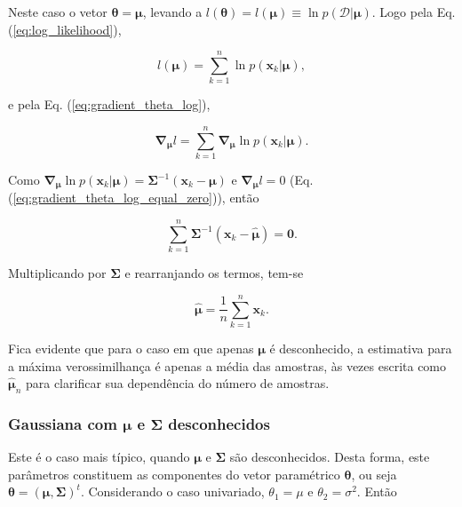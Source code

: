 \documentclass[a4paper,12pt,twocolumn]{article}
\newcommand{\equationref}[1]{Eq. (\ref{eq:#1})}
\begin{document}
Neste caso o vetor $\boldsymbol{\theta} = \boldsymbol{\mu}$, levando a $l(\boldsymbol{\theta}) = l(\boldsymbol{\mu}) \equiv \ln p(\mathcal{D}|\boldsymbol{\mu})$. Logo pela \equationref{log_likelihood},

\begin{equation}
    l(\boldsymbol{\mu}) = \sum_{k=1}^{n} \ln p(\boldsymbol{x}_k|\boldsymbol{\mu}),
    \label{eq:log_mu}
\end{equation}

\noindent e pela \equationref{gradient_theta_log},

\begin{equation}
    \boldsymbol{\nabla}_{\boldsymbol{\mu}} l = \sum_{k=1}^{n} \boldsymbol{\nabla}_{\boldsymbol{\mu}} \ln p(\boldsymbol{x}_k|\boldsymbol{\mu}).
    \label{eq:nabla_mu_log}
\end{equation}

\noindent Como $\boldsymbol{\nabla}_{\boldsymbol{\mu}} \ln p(\boldsymbol{x}_k|\boldsymbol{\mu}) = \boldsymbol{\Sigma}^{-1} (\boldsymbol{x}_k - \boldsymbol{\mu})$ e $\boldsymbol{\nabla}_{\boldsymbol{\mu}} l = 0$ (\equationref{gradient_theta_log_equal_zero}), então

\begin{equation}
    \sum_{k=1}^{n} \boldsymbol{\Sigma}^{-1} (\boldsymbol{x}_k - \boldsymbol{\hat{\mu}}) = \boldsymbol{0}.
    \label{eq:nabla_mu_log_equals_zero}
\end{equation}

\noindent Multiplicando por $\boldsymbol{\Sigma}$ e rearranjando os termos, tem-se

\begin{equation}
    \boldsymbol{\hat{\mu}} = \frac{1}{n} \sum_{k=1}^{n} \boldsymbol{x}_k.
    \label{eq:mu_optimum_case_1}
\end{equation}

Fica evidente que para o caso em que apenas $\boldsymbol{\mu}$ é desconhecido, a estimativa para a máxima verossimilhança é apenas a média das amostras, às vezes escrita como $\boldsymbol{\hat{\mu}}_n$ para clarificar sua dependência do número de amostras.

\subsubsection*{Gaussiana com $\boldsymbol{\mu}$ e $\boldsymbol{\Sigma}$ desconhecidos}

Este é o caso mais típico, quando $\boldsymbol{\mu}$ e $\boldsymbol{\Sigma}$ são desconhecidos. Desta forma, este parâmetros constituem as componentes do vetor paramétrico $\boldsymbol{\theta}$, ou seja $\boldsymbol{\theta} = (\boldsymbol{\mu}, \boldsymbol{\Sigma})^t$. Considerando o caso univariado, $\theta_1 = \mu$ e $\theta_2 = \sigma^2$. Então
\end{document}
